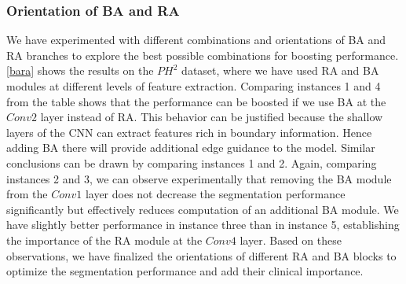 \documentclass[review]{elsarticle}
\begin{document}
\subsubsection{Orientation of BA and RA}
We have experimented with different combinations and orientations of BA and RA branches to explore the best possible combinations for boosting performance. \autoref{bara} shows the results on the $PH^2$ dataset, where we have used RA and BA modules at different levels of feature extraction. Comparing instances 1 and 4 from the table shows that the performance can be boosted if we use BA at the $Conv2$ layer instead of RA. This behavior can be justified because the shallow layers of the CNN can extract features rich in boundary information. Hence adding BA there will provide additional edge guidance to the model. Similar conclusions can be drawn by comparing instances 1 and 2. Again, comparing instances 2 and 3, we can observe experimentally that removing the BA module from the $Conv1$ layer does not decrease the segmentation performance significantly but effectively reduces computation of an additional BA module. We have slightly better performance in instance three than in instance 5, establishing the importance of the RA module at the $Conv4$ layer. Based on these observations, we have finalized the orientations of different RA and BA blocks to optimize the segmentation performance and add their clinical importance.
\end{document}
